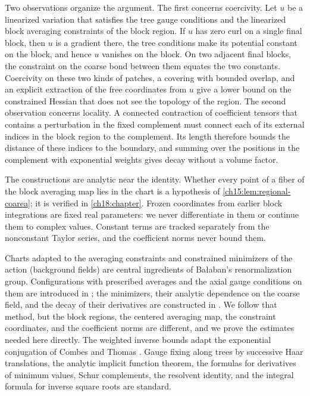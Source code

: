 Two observations organize the argument. The first concerns coercivity. Let $u$ be a linearized variation that satisfies the tree gauge conditions and the linearized block averaging constraints of the block region. If $u$ has zero curl on a single final block, then $u$ is a gradient there, the tree conditions make its potential constant on the block, and hence $u$ vanishes on the block. On two adjacent final blocks, the constraint on the coarse bond between them equates the two constants. Coercivity on these two kinds of patches, a covering with bounded overlap, and an explicit extraction of the free coordinates from $u$ give a lower bound on the constrained Hessian that does not see the topology of the region. The second observation concerns locality. A connected contraction of coefficient tensors that contains a perturbation in the fixed complement must connect each of its external indices in the block region to the complement. Its length therefore bounds the distance of these indices to the boundary, and summing over the positions in the complement with exponential weights gives decay without a volume factor.

The constructions are analytic near the identity. Whether every point of a fiber of the block averaging map lies in the chart is a hypothesis of \cref{ch15:lem:regional-coarea}; it is verified in \cref{ch18:chapter}. Frozen coordinates from earlier block integrations are fixed real parameters: we never differentiate in them or continue them to complex values. Constant terms are tracked separately from the nonconstant Taylor series, and the coefficient norms never bound them.

Charts adapted to the averaging constraints and constrained minimizers of the action (background fields) are central ingredients of Ba\l aban's renormalization group. Configurations with prescribed averages and the axial gauge conditions on them are introduced in \cite[\S\S A--B]{Balaban1985Regular}; the minimizers, their analytic dependence on the coarse field, and the decay of their derivatives are constructed in \cite[Theorem~1, p.~279, and \S G, Proposition~9, p.~309]{Balaban1985Variational}. We follow that method, but the block regions, the centered averaging map, the constraint coordinates, and the coefficient norms are different, and we prove the estimates needed here directly. The weighted inverse bounds adapt the exponential conjugation of Combes and Thomas \cite{CombesThomas1973}. Gauge fixing along trees by successive Haar translations, the analytic implicit function theorem, the formulas for derivatives of minimum values, Schur complements, the resolvent identity, and the integral formula for inverse square roots are standard.


